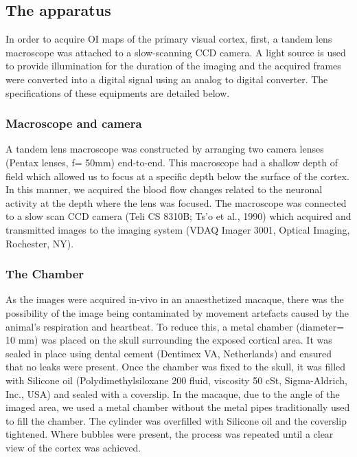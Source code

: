 	\subsection{The apparatus}
	
	In order to acquire OI maps of the primary visual cortex, first, a tandem lens macroscope was attached to a slow-scanning CCD camera. A light source is used to provide illumination for the duration of the imaging and the acquired frames were converted into a digital signal using an analog to digital converter. The specifications of these equipments are detailed below.
	
	\subsubsection{Macroscope and camera}
	
	A tandem lens macroscope was constructed by arranging two camera lenses (Pentax lenses, f= 50mm) end-to-end. This macroscope had a shallow depth of field which allowed us to focus at a specific depth below the surface of the cortex. In this manner, we acquired the blood flow changes related to the neuronal activity at the depth where the lens was focused. The macroscope was connected to a slow scan CCD camera (Teli CS 8310B; Ts’o et al., 1990) which acquired and transmitted images to the imaging system (VDAQ Imager 3001, Optical Imaging, Rochester, NY). 
	
	\subsubsection{The Chamber}
	
	As the images were acquired in-vivo in an anaesthetized macaque, there was the possibility of the image being contaminated by movement artefacts caused by the animal’s respiration and heartbeat. To reduce this, a metal chamber (diameter= 10 mm) was placed on the skull surrounding the exposed cortical area. It was sealed in place using dental cement (Dentimex VA, Netherlands) and ensured that no leaks were present. Once the chamber was fixed to the skull, it was filled with Silicone oil (Polydimethylsiloxane 200 fluid, viscosity 50 cSt, Sigma-Aldrich, Inc., USA) and sealed with a coverslip. In the macaque, due to the angle of the imaged area, we used a metal chamber without the metal pipes traditionally used to fill the chamber. The cylinder was overfilled with Silicone oil and the coverslip tightened. Where bubbles were present, the process was repeated until a clear view of the cortex was achieved.
	
